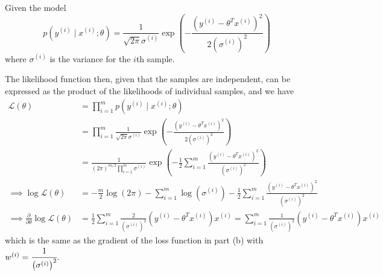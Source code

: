 Given the model
\begin{equation*}
    p\left(y^{(i)} \mid x^{(i)} ; \theta\right)=\frac{1}{\sqrt{2 \pi} \sigma^{(i)}} \exp \left(-\frac{{\left(y^{(i)}-\theta^{T} x^{(i)}\right)}^{2}}{2{\left(\sigma^{(i)}\right)}^{2}}\right)
\end{equation*}
where \( \sigma^{(i)} \) is the variance for the \( i \)th sample.

The likelihood function then, given that the samples are independent, can be expressed as the product of the likelihoods of individual samples, and we have
\begin{align*}
    \mathcal{L}(\theta)
     & =
    \prod_{i=1}^{m}
    p\left(y^{(i)} \mid x^{(i)} ; \theta\right)
    \\ & =
    \prod_{i=1}^{m}
    \frac{1}{\sqrt{2 \pi} \sigma^{(i)}} \exp \left(-\frac{{\left(y^{(i)}-\theta^{T} x^{(i)}\right)}^{2}}{2{\left(\sigma^{(i)}\right)}^{2}}\right)
    \\ & =
    \frac{1}{\left(2 \pi\right)^{m/2} \prod_{i=1}^{m} \sigma^{(i)}}
    \exp \left(
    -\frac{1}{2}
    \sum_{i=1}^{m}
    \frac{{\left(y^{(i)}-\theta^{T} x^{(i)}\right)}^{2}}{{\left(\sigma^{(i)}\right)}^{2}}
    \right)
    \\
    \implies
    \log \mathcal{L}(\theta)
     & =
    -\frac{m}{2} \log(2 \pi) - \sum_{i=1}^{m} \log \left( \sigma^{(i)} \right)
    -\frac{1}{2}
    \sum_{i=1}^{m}
    \frac{{\left(y^{(i)}-\theta^{T} x^{(i)}\right)}^{2}}{{\left(\sigma^{(i)}\right)}^{2}}
    \\
    \implies
    \frac{\partial}{\partial \theta} \log \mathcal{L}(\theta)
     & =
    \frac{1}{2}
    \sum_{i=1}^{m}
    \frac{2}{\left(\sigma^{(i)}\right)^{2}}
    \left(y^{(i)}-\theta^{T} x^{(i)}\right)
    x^{(i)}
    =
    \sum_{i=1}^{m}
    \frac{1}{\left(\sigma^{(i)}\right)^{2}}
    \left(y^{(i)}-\theta^{T} x^{(i)}\right)
    x^{(i)}
\end{align*}
which is the same as the gradient of the loss function in part (b) with \( w^{(i)} = \cfrac{1}{\left(\sigma^{(i)}\right)^{2}} \).
